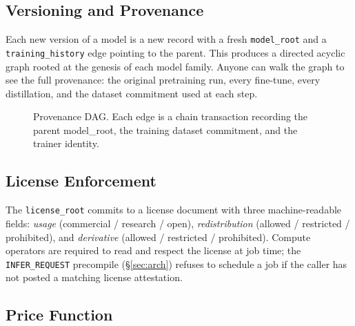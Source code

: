 \subsection{Versioning and Provenance}

Each new version of a model is a new record with a fresh
\texttt{model\_root} and a \texttt{training\_history} edge pointing to
the parent. This produces a directed acyclic graph rooted at the genesis
of each model family. Anyone can walk the graph to see the full
provenance: the original pretraining run, every fine-tune, every
distillation, and the dataset commitment used at each step.

\begin{figure}[h]
\centering
{}
\caption{Provenance DAG. Each edge is a chain transaction recording the
parent model\_root, the training dataset commitment, and the trainer
identity.}
\end{figure}

\subsection{License Enforcement}

The \texttt{license\_root} commits to a license document with three
machine-readable fields: \emph{usage} (commercial / research / open),
\emph{redistribution} (allowed / restricted / prohibited), and
\emph{derivative} (allowed / restricted / prohibited). Compute operators
are required to read and respect the license at job time; the
\texttt{INFER\_REQUEST} precompile (\S\ref{sec:arch}) refuses to schedule
a job if the caller has not posted a matching license attestation.

\subsection{Price Function}

